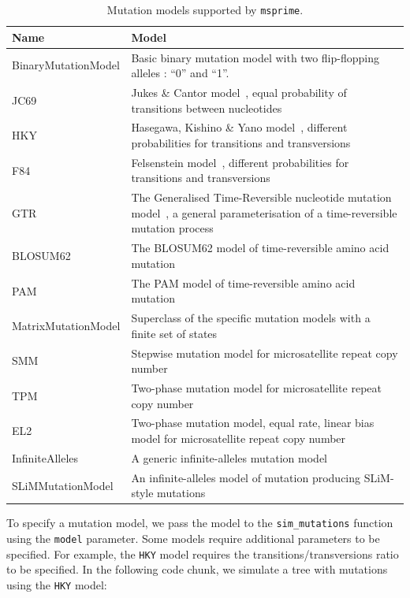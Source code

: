 \documentclass[graybox]{svmult}
\begin{document}
\begin{table}[h]
\centering
\begin{tabular}{|l|p{8cm}|}
\hline
\textbf{Name} & \textbf{Model} \\
\hline
BinaryMutationModel & Basic binary mutation model with two flip-flopping alleles : “0” and “1”. \\
\hline
JC69 & Jukes \& Cantor model~\citep{jukes1969evolution}, equal probability of transitions between nucleotides \\
\hline
HKY & Hasegawa, Kishino \& Yano model~\citep{hasegawa_1985_dating}, different probabilities for transitions and transversions \\
\hline
F84 & Felsenstein model~\citep{felsenstein1996hidden}, different probabilities for transitions and transversions \\
\hline
GTR & The Generalised Time-Reversible nucleotide mutation model~\citep{tavare1986some}, a general parameterisation of a time-reversible mutation process \\
\hline
BLOSUM62 & The BLOSUM62 model of time-reversible amino acid mutation~\citep{henikoff1992amino} \\
\hline
PAM & The PAM model of time-reversible amino acid mutation~\citep{dayhoff1978} \\
\hline
MatrixMutationModel & Superclass of the specific mutation models with a finite set of states \\
\hline
SMM & Stepwise mutation model for microsatellite repeat copy number~\citep{kimura_1978_stepwise} \\
\hline
TPM & Two-phase mutation model for microsatellite repeat copy number~\citep{dirienzo_1994_mutational} \\
\hline
EL2 & Two-phase mutation model, equal rate, linear bias model for microsatellite repeat copy number~\citep{garza_1995_microsatellite} \\
\hline
InfiniteAlleles & A generic infinite-alleles mutation model \\
\hline
SLiMMutationModel & An infinite-alleles model of mutation producing SLiM-style mutations \\
\hline
\end{tabular}
\caption{Mutation models supported by \texttt{msprime}.}
\label{tab:mutation-models}
\end{table}

To specify a mutation model, we pass the model to the \texttt{sim\_mutations} function using the \texttt{model} parameter. Some models
require additional parameters to be specified. For example, the \texttt{HKY} model requires the transitions/transversions ratio to be specified.
In the following code chunk, we simulate a tree with mutations using the \texttt{HKY} model:
\end{document}
